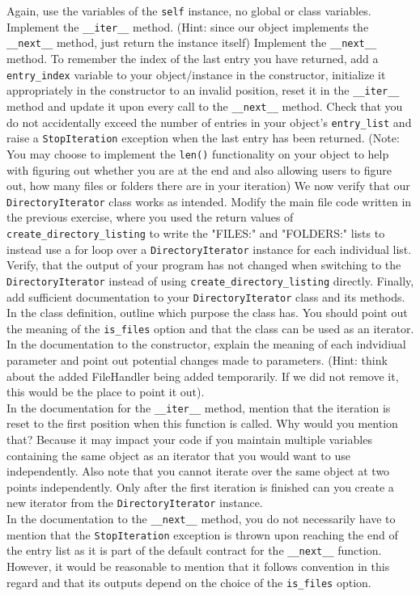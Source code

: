 \documentclass[]{erlangen-problemset}
\begin{document}
\begin{problem}[title={Iterators}]
Again, use the variables of the \texttt{self} instance, no global or class variables.
\Question Implement the \texttt{\_\_iter\_\_} method. (Hint: since our object implements the  \texttt{\_\_next\_\_} method, just return the instance itself)
\Question Implement the \texttt{\_\_next\_\_} method. 
To remember the index of the last entry you have returned, add a \texttt{entry\_index} variable to your object/instance in the constructor, initialize it appropriately in the constructor to an invalid position, reset it in the \texttt{\_\_iter\_\_} method and update it upon every call to the \texttt{\_\_next\_\_} method. 
Check that you do not accidentally exceed the number of entries in your object's \texttt{entry\_list} and raise a \texttt{StopIteration} exception when the last entry has been returned. 
(Note: You may choose to implement the \texttt{len()} functionality on your object to help with figuring out whether you are at the end and also allowing users to figure out, how many files or folders there are in your iteration)
\Question We now verify that our \texttt{DirectoryIterator} class works as intended. 
Modify the main file code written in the previous exercise, where you used the return values of \texttt{create\_directory\_listing} to write the "FILES:" and "FOLDERS:" lists to instead use a for loop over a \texttt{DirectoryIterator} instance for each individual list. 
Verify, that the output of your program has not changed when switching to the \texttt{DirectoryIterator} instead of using  \texttt{create\_directory\_listing} directly.
\Question Finally, add sufficient documentation to your \texttt{DirectoryIterator} class and its methods. 
In the class definition, outline which purpose the class has. You should point out the meaning of the \texttt{is\_files} option and that the class can be used as an iterator. \\
In the documentation to the constructor, explain the meaning of each indvidiual parameter and point out potential changes made to parameters.
(Hint: think about the added FileHandler being added temporarily. If we did not remove it, this would be the place to point it out).\\
In the documentation for the \texttt{\_\_iter\_\_} method, mention that the iteration is reset to the first position when this function is called. 
Why would you mention that? 
Because it may impact your code if you maintain multiple variables containing the same object as an iterator that you would want to use independently. 
Also note that you cannot iterate over the same object at two points independently. 
Only after the first iteration is finished can you create a new iterator from the \texttt{DirectoryIterator} instance.\\
In the documentation to the \texttt{\_\_next\_\_} method, you do not necessarily have to mention that the \texttt{StopIteration} exception is thrown upon reaching the end of the entry list as it is part of the default contract for the \texttt{\_\_next\_\_} function. 
However, it would be reasonable to mention that it follows convention in this regard and that its outputs depend on the choice of the \texttt{is\_files} option.
\end{problem}
\end{document}
